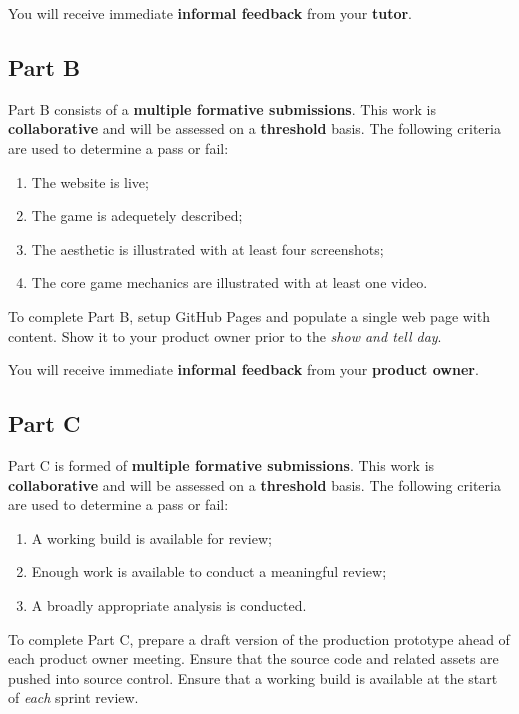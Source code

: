 \documentclass{../fal_assignment}
\begin{document}
You will receive immediate \textbf{informal feedback} from your \textbf{tutor}.

\subsection*{Part B}

Part B consists of a \textbf{multiple formative submissions}. This work is \textbf{collaborative} and will be assessed on a \textbf{threshold} basis. The following criteria are used to determine a pass or fail:

\begin{enumerate}[label=(\alph*)]
	\item The website is live;
	\item The game is adequetely described;
	\item The aesthetic is illustrated with at least four screenshots;
	\item The core game mechanics are illustrated with at least one video.
\end{enumerate}

To complete Part B, setup GitHub Pages and populate a single web page with content. Show it to your product owner prior to the \textit{show and tell day}.

You will receive immediate \textbf{informal feedback} from your \textbf{product owner}.

\subsection*{Part C}

Part C is formed of \textbf{multiple formative submissions}. This work is \textbf{collaborative} and will be assessed on a \textbf{threshold} basis. The following criteria are used to determine a pass or fail:

\begin{enumerate}[label=(\alph*)]
	\item A working build is available for review;
	\item Enough work is available to conduct a meaningful review;
	\item A broadly appropriate analysis is conducted.
\end{enumerate}

To complete Part C, prepare a draft version of the production prototype ahead of each product owner meeting. Ensure that the source code and related assets are pushed into source control. Ensure that a working build is available at the start of \textit{each} sprint review.
\end{document}
